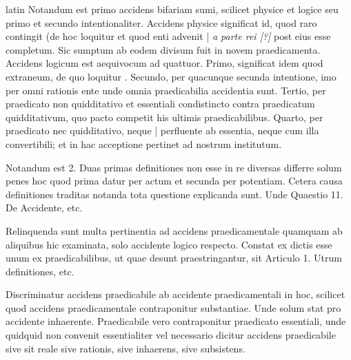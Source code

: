 \begin{otherlanguage*}{latin}
\pstart
Notandum est primo accidens bifariam sumi, scilicet physice et logice seu primo et secundo intentionaliter. Accidens physice significat id, quod raro contingit (de hoc loquitur  et quod enti advenit \textnormal{|} \emph{a parte rei [?]} post eius esse completum. Sic sumptum ab eodem  divisum fuit in novem praedicamenta. Accidens logicum est aequivocum ad quattuor. Primo, significat idem quod extraneum, de quo loquitur . Secundo, per quacunque secunda intentione, imo per omni rationis ente unde omnia praedicabilia accidentia sunt. Tertio, per praedicato non quidditativo et essentiali condistincto contra praedicatum quidditativum, quo pacto competit his ultimis praedicabilibus. Quarto, per praedicato nec quidditativo, neque \textnormal{|} perfluente ab essentia, neque cum illa convertibili; et in hac acceptione pertinet ad nostrum institutum. 
\pend

\pstart
Notandum est 2. Duas primas definitiones non esse in re diversas differre solum penes hoc quod prima datur per actum et secunda per potentiam. Cetera causa definitiones traditas notanda tota questione explicanda sunt. Unde Quaestio 11. De Accidente, etc. 
\pend

\pstart
{}
\pend

\pstart
Relinquenda sunt multa pertinentia ad accidens praedicamentale quamquam ab aliquibus hic examinata, solo accidente logico respecto. Constat ex dictis esse unum ex praedicabilibus, ut quae desunt praestringantur, sit Articulo 1. Utrum definitiones, etc. 
\pend

\pstart
{}
\pend

\pstart
Discriminatur accidens praedicabile ab accidente praedicamentali in hoc, scilicet quod accidens praedicamentale contraponitur substantiae. Unde solum stat pro accidente inhaerente. Praedicabile vero contraponitur praedicato essentiali, unde quidquid non convenit essentialiter vel necessario dicitur accidens praedicabile sive sit reale sive rationis, sive inhaerens, sive subsistens. 
\pend


\end{otherlanguage*}
